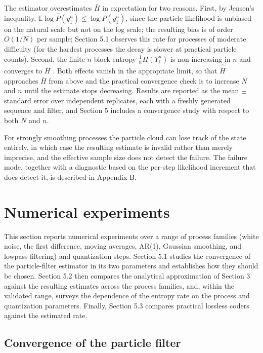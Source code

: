 \documentclass[11pt]{article}
\begin{document}
The estimator overestimates \(\bar H\) in expectation for two reasons. First, by Jensen's inequality, \(\mathbb E\log\hat P(y_1^n) \le \log P(y_1^n)\), since the particle likelihood is unbiased on the natural scale but not on the log scale; the resulting bias is of order \(O(1/N)\) per sample; Section 5.1 observes this rate for processes of moderate difficulty (for the hardest processes the decay is slower at practical particle counts). Second, the finite-\(n\) block entropy \(\tfrac1n H(Y_1^n)\) is non-increasing in \(n\) and converges to \(\bar H\) \cite{CoverThomas2006}. Both effects vanish in the appropriate limit, so that \(\hat{\bar H}\) approaches \(\bar H\) from above and the practical convergence check is to increase \(N\) and \(n\) until the estimate stops decreasing. Results are reported as the mean \(\pm\) standard error over independent replicates, each with a freshly generated sequence and filter, and Section 5 includes a convergence study with respect to both \(N\) and \(n\).

For strongly smoothing processes the particle cloud can lose track of the state entirely, in which case the resulting estimate is invalid rather than merely imprecise, and the effective sample size does not detect the failure. The failure mode, together with a diagnostic based on the per-step likelihood increment that does detect it, is described in Appendix B.

\section{Numerical experiments}\label{numerical-experiments}

This section reports numerical experiments over a range of process families (white noise, the first difference, moving averages, AR(1), Gaussian smoothing, and lowpass filtering) and quantization steps. Section 5.1 studies the convergence of the particle-filter estimator in its two parameters and establishes how they should be chosen. Section 5.2 then compares the analytical approximation of Section 3 against the resulting estimates across the process families, and, within the validated range, surveys the dependence of the entropy rate on the process and quantization parameters. Finally, Section 5.3 compares practical lossless coders against the estimated rate.

\subsection{Convergence of the particle filter}\label{convergence-of-the-particle-filter}
\end{document}
